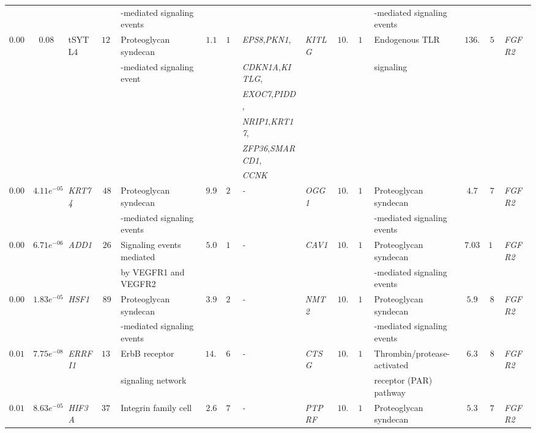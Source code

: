 \documentclass[10pt]{article}
\begin{document}
{\begin{landscape}
\begin{table}[!htbp]
{\begin{tabular}{c c l c l c c l |l c c l c c l}
&&&& -mediated signaling events &&&&&&& -mediated signaling events &&& \tabularnewline

$0.008$ & $0.08$ & t{SYTL4} & $129$ & Proteoglycan syndecan & $1.1$ & $10$ &\textit{EPS8},\textit{PKN1}, & \textit{KITLG} &$10.0$ & $14$ & Endogenous TLR & $136.2$ & $5$ & \textit{FGFR2} \tabularnewline

&&&&-mediated signaling event &&&\textit{CDKN1A},\textit{KITLG}, & & & & signaling & & & \tabularnewline

&&&&&&&\textit{EXOC7},\textit{PIDD}, & & & && & & \tabularnewline

&&&&&&&\textit{NRIP1},\textit{KRT17}, &&&&&&& \tabularnewline

&&&&&&&\textit{ZFP36},\textit{SMARCD1}, &&&&&&& \tabularnewline

&&&&&&&\textit{CCNK} &&&&&&& \tabularnewline

$0.002$ & $4.11e^{-05}$ & \textit{KRT74} & $48$ & Proteoglycan syndecan & $9.9$ & $22$&\textit{-} & \textit{OGG1} & $10.4$ & $12$ & Proteoglycan syndecan & $4.7$ & $7$ & \textit{FGFR2} \tabularnewline

&&&& -mediated signaling events &&&&&&& -mediated signaling events &&&\tabularnewline

$0.003$ & $6.71e^{-06}$ & \textit{ADD1} & $26$ & Signaling events mediated & $5.0$ & $11$&\textit{-} & \textit{CAV1} & $10.6$ & $13$ & Proteoglycan syndecan & $7.03$ & $10$ & \textit{FGFR2} \tabularnewline

&&&& by VEGFR1 and VEGFR2 &&&&&&& -mediated signaling events &&&\tabularnewline

$0.009$ & $1.83e^{-05}$ & \textit{HSF1} & $89$ & Proteoglycan syndecan & $3.9$ & $21$&\textit{-} & \textit{NMT2} & $10.5$ & $13$ & Proteoglycan syndecan & $5.9$ & $8$ & \textit{FGFR2} \tabularnewline

&&&& -mediated signaling events  &&&&&&& -mediated signaling events &&&\tabularnewline

$0.01$ & $7.75e^{-08}$ & \textit{ERRFI1} & $130$ & ErbB receptor  & $14.8$ & $61$&\textit{-} & \textit{CTSG} & $10.7$ & $13$ & Thrombin/protease-activated & $6.3$ & $8$ & \textit{FGFR2} \tabularnewline

&&&& signaling network &&&&&&&  receptor (PAR) pathway &&&\tabularnewline

$0.01$ & $8.63e^{-05}$ & \textit{HIF3A} & $373$ & Integrin family cell & $2.6$ & $70$&\textit{-} & \textit{PTPRF} & $10.3$ & $12$ & Proteoglycan syndecan & $5.3$ & $7$ & \textit{FGFR2} \tabularnewline


\end{tabular}}
\end{table}
\end{landscape}}
\end{document}
